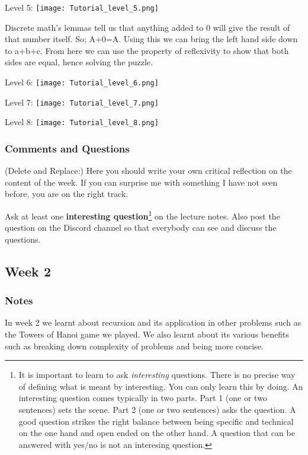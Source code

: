 \documentclass{article}
\theoremstyle{theorem}
\theoremstyle{definition}
\theoremstyle{remark}
\begin{document}
Level 5: 
\texttt{[image: Tutorial\_level\_5.png]}

Discrete math's lemmas tell us that anything added to 0 will give the result of that number itself. So; A+0=A. 
Using this we can bring the left hand side down to a+b+c. 
From here we can use the property of reflexivity to show that both sides are equal, hence solving the puzzle. 

Level 6:
\texttt{[image: Tutorial\_level\_6.png]}

Level 7:
\texttt{[image: Tutorial\_level\_7.png]}

Level 8:
\texttt{[image: Tutorial\_level\_8.png]}


\subsubsection*{Comments and Questions}

(Delete and Replace:) Here you should write your own critical reflection on the content of the week. If you can surprise me with something I have not seen before, you are on the right track.


Ask at least one \textbf{interesting question}\footnote{It is important to learn to ask \emph{interesting} questions. There is no precise way of defining what is meant by interesting. You can only learn this by doing. An interesting question comes typically in two parts. Part 1 (one or two sentences) sets the scene. Part 2 (one or two sentences) asks the question. A good question strikes the right balance between being specific and technical on the one hand and open ended on the other hand. A question that can be answered with yes/no is not an interesing question.} on the lecture notes. Also post the question on the Discord channel so that everybody can see and discuss the questions.

\subsection{Week 2}

\subsubsection*{Notes}

In week 2 we learnt about recursion and its application in other problems such as the Towers of Hanoi game we played. We also learnt about its various benefits such as breaking down complexity of problems and being more concise.
\end{document}
